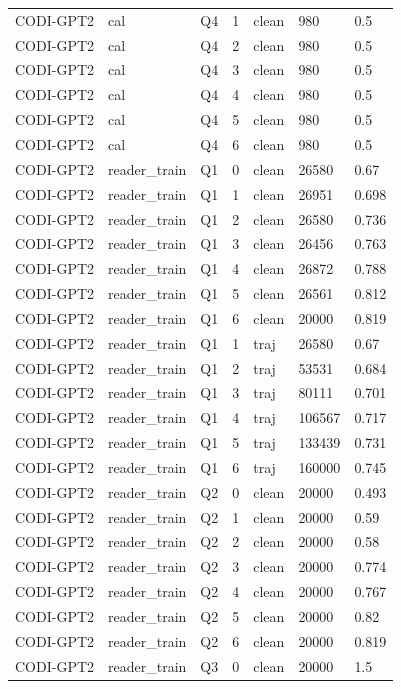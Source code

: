\begin{longtable}{@{}p{}p{}p{}p{}p{}p{}p{}@{}}
CODI-GPT2 & cal & Q4 & 1 & clean & 980 & 0.5 \\
CODI-GPT2 & cal & Q4 & 2 & clean & 980 & 0.5 \\
CODI-GPT2 & cal & Q4 & 3 & clean & 980 & 0.5 \\
CODI-GPT2 & cal & Q4 & 4 & clean & 980 & 0.5 \\
CODI-GPT2 & cal & Q4 & 5 & clean & 980 & 0.5 \\
CODI-GPT2 & cal & Q4 & 6 & clean & 980 & 0.5 \\
CODI-GPT2 & reader\_train & Q1 & 0 & clean & 26580 & 0.67 \\
CODI-GPT2 & reader\_train & Q1 & 1 & clean & 26951 & 0.698 \\
CODI-GPT2 & reader\_train & Q1 & 2 & clean & 26580 & 0.736 \\
CODI-GPT2 & reader\_train & Q1 & 3 & clean & 26456 & 0.763 \\
CODI-GPT2 & reader\_train & Q1 & 4 & clean & 26872 & 0.788 \\
CODI-GPT2 & reader\_train & Q1 & 5 & clean & 26561 & 0.812 \\
CODI-GPT2 & reader\_train & Q1 & 6 & clean & 20000 & 0.819 \\
CODI-GPT2 & reader\_train & Q1 & 1 & traj & 26580 & 0.67 \\
CODI-GPT2 & reader\_train & Q1 & 2 & traj & 53531 & 0.684 \\
CODI-GPT2 & reader\_train & Q1 & 3 & traj & 80111 & 0.701 \\
CODI-GPT2 & reader\_train & Q1 & 4 & traj & 106567 & 0.717 \\
CODI-GPT2 & reader\_train & Q1 & 5 & traj & 133439 & 0.731 \\
CODI-GPT2 & reader\_train & Q1 & 6 & traj & 160000 & 0.745 \\
CODI-GPT2 & reader\_train & Q2 & 0 & clean & 20000 & 0.493 \\
CODI-GPT2 & reader\_train & Q2 & 1 & clean & 20000 & 0.59 \\
CODI-GPT2 & reader\_train & Q2 & 2 & clean & 20000 & 0.58 \\
CODI-GPT2 & reader\_train & Q2 & 3 & clean & 20000 & 0.774 \\
CODI-GPT2 & reader\_train & Q2 & 4 & clean & 20000 & 0.767 \\
CODI-GPT2 & reader\_train & Q2 & 5 & clean & 20000 & 0.82 \\
CODI-GPT2 & reader\_train & Q2 & 6 & clean & 20000 & 0.819 \\
CODI-GPT2 & reader\_train & Q3 & 0 & clean & 20000 & 1.5 \\

\end{longtable}
